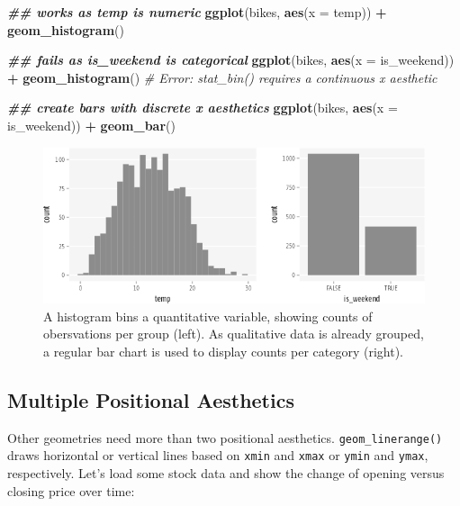 \documentclass[
]{krantz}
\makeatletter
\newenvironment{Shaded}{\begin{snugshade}}{\end{snugshade}}
\newcommand{\AttributeTok}[1]{\textcolor[rgb]{0.27,0.27,0.27}{#1}}
\newcommand{\CommentTok}[1]{\textcolor[rgb]{0.37,0.37,0.37}{\textit{#1}}}
\newcommand{\DocumentationTok}[1]{\textcolor[rgb]{0.37,0.37,0.37}{\textbf{\textit{#1}}}}
\newcommand{\FunctionTok}[1]{\textcolor[rgb]{0.27,0.27,0.27}{\textbf{#1}}}
\newcommand{\NormalTok}[1]{#1}
\newcommand{\SpecialCharTok}[1]{\textcolor[rgb]{0.43,0.43,0.43}{\textbf{#1}}}
\newenvironment{kframe}{%
\medskip{}
\setlength{\fboxsep}{.8em}
 \def\at@end@of@kframe{}%
 \ifinner\ifhmode%
  \def\at@end@of@kframe{\end{minipage}}%
  \begin{minipage}{\columnwidth}%
 \fi\fi%
 \def\FrameCommand##1{\hskip\@totalleftmargin \hskip-\fboxsep
 \colorbox{shadecolor}{##1}\hskip-\fboxsep
     \hskip-\linewidth \hskip-\@totalleftmargin \hskip\columnwidth}%
 \MakeFramed {\advance\hsize-\width
   \@totalleftmargin\z@ \linewidth\hsize
   \@setminipage}}%
 {\par\unskip\endMakeFramed%
 \at@end@of@kframe}
\renewenvironment{Shaded}{\begin{kframe}}{\end{kframe}}
\makeatother
\begin{document}
\begin{Shaded}
\begin{Highlighting}[]
\DocumentationTok{\#\# works as \textasciigrave{}temp\textasciigrave{} is numeric}
\FunctionTok{ggplot}\NormalTok{(bikes, }\FunctionTok{aes}\NormalTok{(}\AttributeTok{x =}\NormalTok{ temp)) }\SpecialCharTok{+} \FunctionTok{geom\_histogram}\NormalTok{()}

\DocumentationTok{\#\# fails as \textasciigrave{}is\_weekend\textasciigrave{} is categorical}
\FunctionTok{ggplot}\NormalTok{(bikes, }\FunctionTok{aes}\NormalTok{(}\AttributeTok{x =}\NormalTok{ is\_weekend)) }\SpecialCharTok{+} \FunctionTok{geom\_histogram}\NormalTok{()}
\CommentTok{\# Error: \textasciigrave{}stat\_bin()\textasciigrave{} requires a continuous x aesthetic}

\DocumentationTok{\#\# create bars with discrete x aesthetics}
\FunctionTok{ggplot}\NormalTok{(bikes, }\FunctionTok{aes}\NormalTok{(}\AttributeTok{x =}\NormalTok{ is\_weekend)) }\SpecialCharTok{+} \FunctionTok{geom\_bar}\NormalTok{()}
\end{Highlighting}
\end{Shaded}

\begin{figure}
\centering
\includegraphics{bookdown_files/figure-latex/07layerPositionalTypeHistogram-1.png}
\caption{\label{fig:07layerPositionalTypeHistogram}A histogram bins a quantitative variable, showing counts of obersvations per group (left). As qualitative data is already grouped, a regular bar chart is used to display counts per category (right).}
\end{figure}

\hypertarget{multiple-positional-aesthetics}{%
\subsection{Multiple Positional Aesthetics}\label{multiple-positional-aesthetics}}

Other geometries need more than two positional aesthetics. \texttt{geom\_linerange()} draws horizontal or vertical lines based on \texttt{xmin} and \texttt{xmax} or \texttt{ymin} and \texttt{ymax}, respectively. Let's load some stock data and show the change of opening versus closing price over time:
\end{document}
